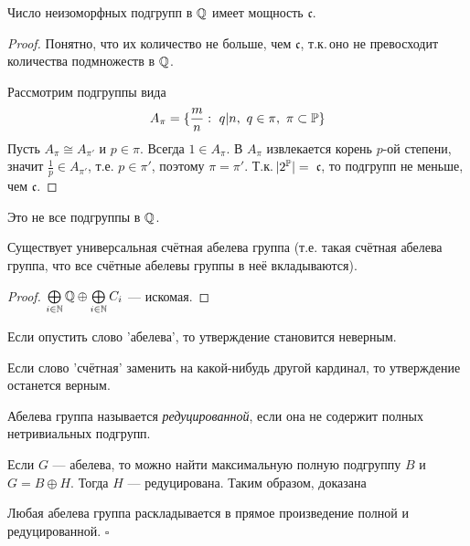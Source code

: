 \documentclass[10pt,a4paper,draft]{article}
\begin{document}
\begin{theorem}Число неизоморфных подгрупп в $\mathbb Q$ имеет мощность
$\mathfrak{c}$.
\end{theorem}

\begin{proof} Понятно, что их количество не больше, чем $\mathfrak{c}$,
т.к.\,оно не превосходит количества подмножеств в $\mathbb Q$.

Рассмотрим подгруппы вида
$$
A_\pi=\{\frac{m}{n}:~q|n,~q\in\pi,~\pi\subset \mathbb P\}
$$
Пусть $A_\pi\cong A_{\pi'}$ и $p\in\pi$. Всегда $1\in A_\pi$. В
$A_\pi$ извлекается корень $p$-ой степени, значит $\frac{1}{p}\in
A_{\pi'}$, т.е. $p\in\pi'$, поэтому $\pi=\pi'$. Т.к.\,$|2^\mathbb P|=\,$
$\mathfrak{c}$, то подгрупп не меньше, чем
$\mathfrak{c}$.\end{proof}

\begin{note}
Это не все подгруппы в $\mathbb Q$.
\end{note}

\begin{theorem}Существует
универсальная счётная абелева группа (т.е. такая счётная абелева группа, что все
счётные абелевы группы в неё вкладываются).
\end{theorem}

\begin{proof}
$\bigoplus\limits_{i\in\mathbb N}\mathbb Q\oplus\bigoplus\limits_{i\in\mathbb N}C_i$
--- искомая.\end{proof}

\begin{note}
Если опустить слово 'абелева', то утверждение становится неверным.
\end{note}

\begin{note}
Если слово 'счётная' заменить на какой-нибудь другой кардинал, то
утверждение останется верным.
\end{note}

Абелева группа называется {\em
редуцированной}, если она не
содержит полных нетривиальных подгрупп.

Если $G$ --- абелева, то можно найти максимальную полную подгруппу
$B$ и $G=B\oplus H$. Тогда $H$ --- редуцирована. Таким образом,
доказана

\begin{theorem}
Любая абелева группа раскладывается в
прямое произведение полной и редуцированной. $\square$
\end{theorem}
\end{document}

